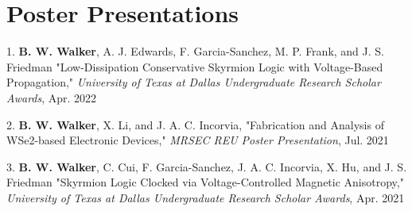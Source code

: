 \documentclass[letterpaper,11pt]{article}
\begin{document}
\section{Poster Presentations}
    \begin{itemize}[leftmargin=0.15in, label={}]
        \small{\item{
         1.\textbf{\hspace{3pt} B. W. Walker}{, A. J. Edwards, F. Garcia-Sanchez, M. P. Frank, and J. S. Friedman "Low-Dissipation Conservative Skyrmion Logic with Voltage-Based Propagation," \textit{University of Texas at Dallas Undergraduate Research Scholar Awards}, Apr. 2022}
        }}
        \small{\item{
         2.\textbf{\hspace{3pt} B. W. Walker}, X. Li, and J. A. C. Incorvia, {"Fabrication and Analysis of WSe2-based Electronic Devices," \textit{MRSEC REU Poster Presentation}, Jul. 2021}
        }}
        \small{\item{
         3.\textbf{\hspace{3pt} B. W. Walker}{, C. Cui, F. Garcia-Sanchez, J. A. C. Incorvia, X. Hu, and J. S. Friedman "Skyrmion Logic Clocked via Voltage-Controlled Magnetic Anisotropy," \textit{University of Texas at Dallas Undergraduate Research Scholar Awards}, Apr. 2021}
        }}
     \end{itemize}
\end{document}
